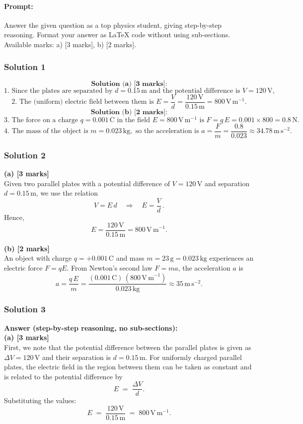 \documentclass{article}
\begin{document}
\paragraph{Prompt: \\} 
Answer the given question as a top physics student, giving step-by-step reasoning. Format your answer as LaTeX code without using sub-sections. Available marks: a) [3 marks], b) [2 marks].

\subsubsection{Solution 1}
\[
\textbf{Solution (a) [3 marks]:}
\]
\[
1.\text{ Since the plates are separated by }d = 0.15\,\mathrm{m}\text{ and the potential difference is }V=120\,\mathrm{V},
\]
\[
2.\text{ The (uniform) electric field between them is }E=\frac{V}{d} = \frac{120\,\mathrm{V}}{0.15\,\mathrm{m}}=800\,\mathrm{V\,m^{-1}}.
\]
\[
\textbf{Solution (b) [2 marks]:}
\]
\[
3.\text{ The force on a charge }q=0.001\,\mathrm{C}\text{ in the field }E=800\,\mathrm{V\,m^{-1}}\text{ is }F = q\,E = 0.001\times 800 = 0.8\,\mathrm{N}.
\]
\[
4.\text{ The mass of the object is }m=0.023\,\mathrm{kg},\text{ so the acceleration is }a = \frac{F}{m} = \frac{0.8}{0.023}\approx 34.78\,\mathrm{m\,s^{-2}}.
\]


\subsubsection{Solution 2}
\textbf{(a) [3 marks]}\\
Given two parallel plates with a potential difference of \(V=120\,\mathrm{V}\) and separation 
\(d = 0.15\,\mathrm{m}\), we use the relation
\[
V = E\,d \quad\Longrightarrow\quad E = \frac{V}{d} \,.
\]
Hence,
\[
E = \frac{120\,\mathrm{V}}{0.15\,\mathrm{m}} = 800\,\mathrm{V\,m}^{-1}.
\]

\textbf{(b) [2 marks]}\\
An object with charge \(q = +0.001\,\mathrm{C}\) and mass \(m=23\,\mathrm{g} = 0.023\,\mathrm{kg}\) 
experiences an electric force \(F = qE\). From Newton's second law \(F = m a\), 
the acceleration \(a\) is
\[
a = \frac{q\,E}{m} 
= \frac{(0.001\,\mathrm{C})\,(800\,\mathrm{V\,m}^{-1})}{0.023\,\mathrm{kg}}
\approx 35\,\mathrm{m\,s}^{-2}.
\]


\subsubsection{Solution 3}
\textbf{Answer (step-by-step reasoning, no sub-sections):}\\[6pt]
\textbf{(a) [3 marks]}\\
First, we note that the potential difference between the parallel plates is given as 
\(\Delta V = 120\,\mathrm{V}\) and their separation is \(d = 0.15\,\mathrm{m}\). For 
uniformly charged parallel plates, the electric field in the region between them can be 
taken as constant and is related to the potential difference by
\[
E \;=\; \frac{\Delta V}{d}.
\]
Substituting the values:
\[
E \;=\; \frac{120\,\mathrm{V}}{0.15\,\mathrm{m}}
\;=\; 800\,\mathrm{V\,m^{-1}}.
\]
\end{document}
